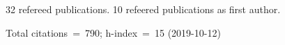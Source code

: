 32 refereed publications. 10 refeered publications as first author.

Total citations~=~790; h-index~=~15 (2019-10-12)